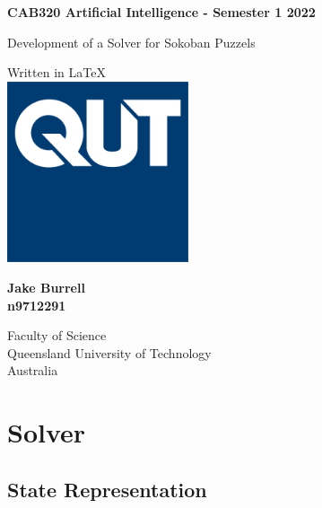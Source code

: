 \documentclass[a4paper,12pt]{article}
\begin{document}
\begin{titlepage}
   \begin{center}
       \vspace*{1cm}
 
       \textbf{CAB320 Artificial Intelligence - Semester 1 2022}
 
       \vspace{0.5cm}
        \LARGE{Development of a Solver for Sokoban Puzzels}
 
       \vspace{1.5cm}

       \vfill
       
       \vspace{0.8cm}
       \normalsize
 	   Written in \LaTeX \\
       \includegraphics[width=0.4\textwidth]{QUT.jpg}

       \large
       \textbf{Jake Burrell}\\
       \textbf{n9712291}

       \vspace{1.5cm}
 
       \normalsize
       Faculty of Science \\
       Queensland University of Technology\\
       Australia\\ 
   \end{center}
\end{titlepage}


\section{Solver}


\subsection{State Representation}
\end{document}
